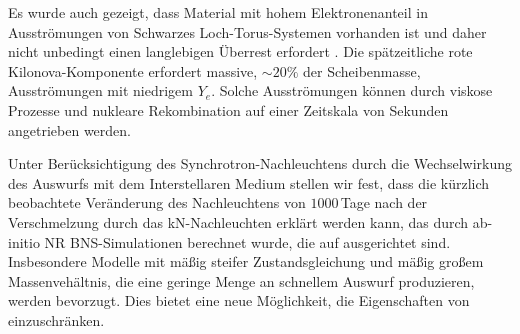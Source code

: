 
Es wurde auch gezeigt, dass Material mit hohem Elektronenanteil in Ausströmungen 
von Schwarzes Loch-Torus-Systemen vorhanden ist und daher nicht unbedingt einen langlebigen Überrest erfordert 
\citep{Fujibayashi:2020qda}.
Die spätzeitliche rote Kilonova-Komponente erfordert massive, ${\sim}20\%$ der Scheibenmasse, 
Ausströmungen mit niedrigem $Y_e$. Solche Ausströmungen können durch viskose Prozesse und nukleare Rekombination 
auf einer Zeitskala von Sekunden \citep[\eg][]{Metzger:2008av} angetrieben werden.


Unter Berücksichtigung des Synchrotron-Nachleuchtens durch die Wechselwirkung des Auswurfs mit dem 
Interstellaren Medium stellen wir fest, dass die kürzlich beobachtete Veränderung des Nachleuchtens von \GRB{} 
$1000\,$Tage nach der Verschmelzung durch das kN-Nachleuchten erklärt werden kann, das durch 
ab-initio NR BNS-Simulationen berechnet wurde, die auf \GW{} ausgerichtet sind. 
Insbesondere Modelle mit mäßig steifer Zustandsgleichung und mäßig großem Massenvehältnis,
die eine geringe Menge an schnellem Auswurf produzieren, werden bevorzugt.
Dies bietet eine neue Möglichkeit, die Eigenschaften von \GW{} einzuschränken. 
